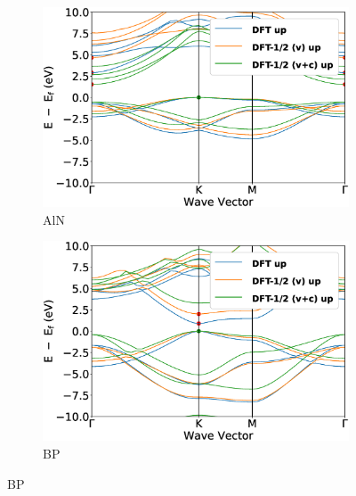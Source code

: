 \begin{figure}[!ht]
\centering %
\begin{subfigure}{0.45\textwidth}
  \includegraphics[width=\linewidth]{images/band_2d_aln.eps}
  \caption{AlN}
\end{subfigure}\hfil %
\begin{subfigure}{0.45\textwidth}
  \includegraphics[width=\linewidth]{images/band_2d_bp.eps}
  \caption{BP}
\end{subfigure}

\medskip


\end{figure}
